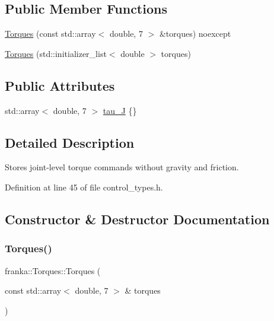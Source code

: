\subsection*{Public Member Functions}
\begin{DoxyCompactItemize}
\item 
\hyperlink{classfranka_1_1Torques_a509d63195827289ffc645e4b62a9750d}{Torques} (const std\+::array$<$ double, 7 $>$ \&torques) noexcept
\item 
\hyperlink{classfranka_1_1Torques_a744a08e16dcfc40b3a90ab6a85bac0d8}{Torques} (std\+::initializer\+\_\+list$<$ double $>$ torques)
\end{DoxyCompactItemize}
\subsection*{Public Attributes}
\begin{DoxyCompactItemize}
\item 
std\+::array$<$ double, 7 $>$ \hyperlink{classfranka_1_1Torques_ac2a266cc2d3b7e0fb4f8eff045dbaed8}{tau\+\_\+J} \{\}
\end{DoxyCompactItemize}


\subsection{Detailed Description}
Stores joint-\/level torque commands without gravity and friction. 

Definition at line 45 of file control\+\_\+types.\+h.



\subsection{Constructor \& Destructor Documentation}
\mbox{\label{classfranka_1_1Torques_a509d63195827289ffc645e4b62a9750d}} 
\subsubsection{\texorpdfstring{Torques()}{Torques()}\hspace{0.1cm}{\footnotesize\ttfamily [1/2]}}
{\footnotesize\ttfamily franka\+::\+Torques\+::\+Torques (\begin{DoxyParamCaption}\item[{const std\+::array$<$ double, 7 $>$ \&}]{torques }\end{DoxyParamCaption})\hspace{0.3cm}{\ttfamily [noexcept]}}

